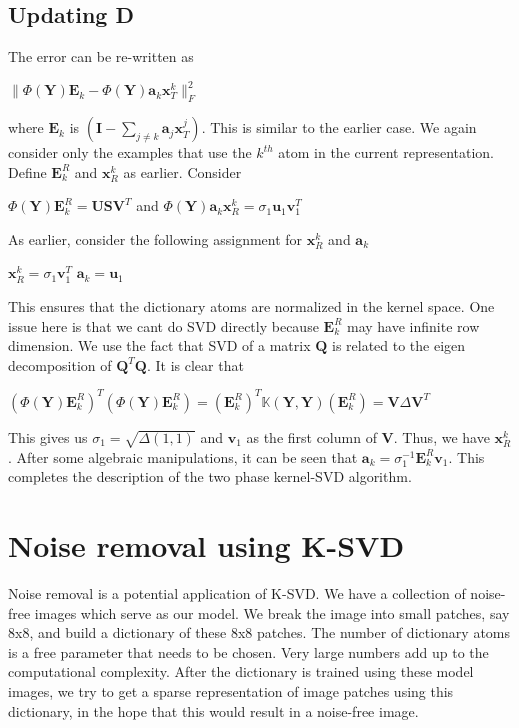 \documentclass[10pt,a4paper,final]{article}
\begin{document}
\subsection{Updating D}
The error can be re-written as 
\begin{center}
$\|\Phi\left(\mathbf{Y}\right)\mathbf{E}_k-\Phi\left(\mathbf{Y}\right)\mathbf{a}_k\mathbf{x}_T^k\|_F^2$
\end{center}
where $\mathbf{E}_k$ is $\left(\mathbf{I}-\sum_{j\neq k}\mathbf{a}_j\mathbf{x}_T^j\right)$.
This is similar to the earlier case. We again consider only the examples that use the $k^{th}$ atom in the current representation. Define $\mathbf{E}_k^R$ and $\mathbf{x}_R^k$ as earlier.  Consider
\begin{center}
$\Phi\left(\mathbf{Y}\right)\mathbf{E}_k^R = \mathbf{USV}^T$ and $\Phi\left(\mathbf{Y}\right)\mathbf{a}_k\mathbf{x}_R^k=\sigma_1\mathbf{u}_1\mathbf{v}_1^T$
\end{center}
As earlier, consider the following assignment for $\mathbf{x}_R^k$ and $\mathbf{a}_k$
\begin{center}
$\mathbf{x}_R^k = \sigma_1\mathbf{v}_1^T$
$\mathbf{a}_k = \mathbf{u}_1$ 
\end{center}
This ensures that the dictionary atoms are normalized in the kernel space. 
One issue here is that we cant do SVD directly because $\mathbf{E}_k^R$ may have infinite row dimension. We use the fact that SVD of a matrix $\mathbf{Q}$ is related to the eigen decomposition of $\mathbf{Q}^T\mathbf{Q}$. It is clear that
\begin{center}
$\left(\Phi\left(\mathbf{Y}\right)\mathbf{E}_k^R\right)^T\left(\Phi\left(\mathbf{Y}\right)\mathbf{E}_k^R\right)=\left(\mathbf{E}_k^R\right)^T\mathbb{K}\left(\mathbf{Y},\mathbf{Y}\right)\left(\mathbf{E}_k^R\right)=\mathbf{V}\Delta\mathbf{V}^T$
\end{center}
This gives us $\sigma_1=\sqrt{\Delta\left(1,1\right)}$ and $\mathbf{v}_1$ as the first column of $\mathbf{V}$. Thus, we have $\mathbf{x}_R^k$. After some algebraic manipulations, it can be seen that $\mathbf{a}_k=\sigma_1^{-1}\mathbf{E}_k^R\mathbf{v}_1$. This completes the description of the two phase kernel-SVD algorithm.
\section{Noise removal using K-SVD}
Noise removal is a potential application of K-SVD. We have a collection of noise-free images which serve as our model. We break the image into small patches, say 8x8, and build a dictionary of these 8x8 patches. The number of dictionary atoms is a free parameter that needs to be chosen. Very large numbers add up to the computational complexity. After the dictionary is trained using these model images, we try to get a sparse representation of image patches using this dictionary, in the hope that this would result in a noise-free image. 
\end{document}
